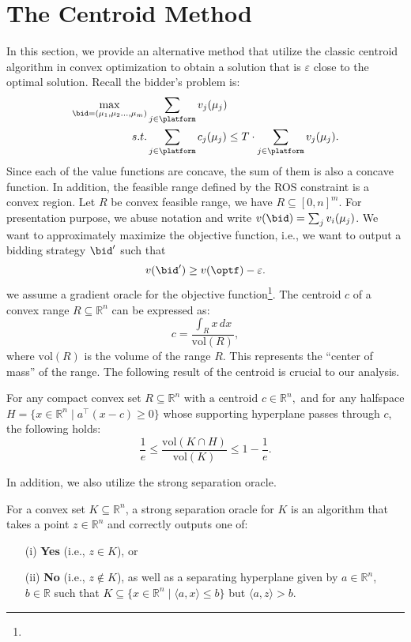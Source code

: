 \section{The Centroid Method}
In this section, we provide an alternative method that utilize the classic centroid algorithm in convex optimization to obtain a solution that is $\varepsilon$ close to the optimal solution. Recall the bidder's problem is:
\begin{align*}
    \max_{\bid=(\mu_1, \mu_2 \dots, \mu_m)} &\sum_{j \in \platform} v_j(\mu_j) \nonumber\\
    s.t. & \sum_{j \in \platform} c_j(\mu_j) \leq T \cdot \sum_{j \in \platform} v_j(\mu_j). 
\end{align*}
 Since each of the value functions are concave, the sum of them is also a concave function. In addition, the feasible range defined by the ROS constraint is a convex region.  Let $R$ be convex feasible range, we have $R \subseteq [0,n]^m$. For presentation purpose, we abuse notation and write $v(\bid) = \sum_j v_i(\mu_j)$. We want to approximately maximize the objective function, i.e., we want to output a bidding strategy $\bid'$ such that 
\[ v(\bid') \geq  v(\optf)-\varepsilon.\]
we assume a gradient oracle for the objective function\footnote{}.
The centroid \( c \) of a convex range \( R \subseteq \mathbb{R}^n \) can be expressed as:
\[
c = \frac{\int_R x \,dx}{\text{vol}(R)}, 
\]
where \(\text{vol}(R)\) is the volume of the range \( R \). This represents the ``center of mass'' of the range.
The following
result of the centroid is crucial to our analysis. 
\begin{lemma}
For any compact convex set  $R \subseteq \mathbb{R}^n \text{ with a centroid } c \in \mathbb{R}^n,$ 
and for any halfspace \( H = \{ x \in \mathbb{R}^n \mid a^\top (x - c) \geq 0 \} \) whose supporting hyperplane passes through \( c \), the following holds:
\[
\frac{1}{e} \leq \frac{\text{vol}(K \cap H)}{\text{vol}(K)} \leq 1 - \frac{1}{e}.
\]
\end{lemma} 
In addition, we also utilize the strong separation oracle.
\begin{definition}
For a convex set $K \subseteq \mathbb{R}^n$, a strong separation oracle for $K$ is an algorithm that takes a point $z \in \mathbb{R}^n$ and correctly outputs one of:
\begin{itemize}
    \item[(i)] \textbf{Yes} (i.e., $z \in K$), or
    \item[(ii)] \textbf{No} (i.e., $z \notin K$), as well as a separating hyperplane given by $a \in \mathbb{R}^n$, $b \in \mathbb{R}$ such that $K \subseteq \{ x \in \mathbb{R}^n \mid \langle a, x \rangle \leq b \}$ but $\langle a, z \rangle > b$.
\end{itemize}
\end{definition}
